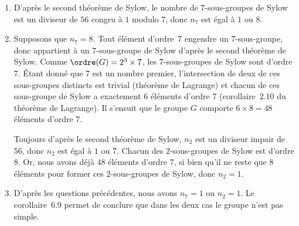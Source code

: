 \begin{enumerate}
  \item
    D'après le second théorème de Sylow, le nombre de $7$-sous-groupes de Sylow est un diviseur de $56$ congru à $1$ modulo 7, donc $n_7$ est égal à $1$ ou $8$.

  \item
    Supposons que $n_7 = 8$.
    Tout élément d'ordre~$7$ engendre un $7$-sous-groupe, donc appartient à un $7$-sous-groupe de Sylow d'après le second théorème de Sylow.
    Comme $\ordre(G) = 2^3\times 7$, les $7$-sous-groupes de Sylow sont d'ordre $7$.
    Étant donné que $7$ est un nombre premier, l'intersection de deux de ces sous-groupes distincts est trivial (théorème de Lagrange) et chacun de ces sous-groupe de Sylow a exactement $6$ éléments d'ordre $7$ (corollaire~2.10 du théorème de Lagrange).
    Il s'ensuit que le groupe $G$ comporte $6\times 8 = 48$ éléments d'ordre 7.

    Toujours d'après le second théorème de Sylow, $n_2$ est un diviseur impair de $56$, donc $n_2$ est égal à $1$ ou $7$.
    Chacun des $2$-sous-groupes de Sylow est d'ordre $8$.
    Or, nous avons déjà $48$ éléments d'ordre $7$, si bien qu'il ne reste que $8$ éléments pour former ces $2$-sous-groupes de Sylow, donc $n_2 = 1$.

  \item
    D'après les questions précédentes, nous avons $n_7 = 1$ ou $n_2 = 1$.
    Le corollaire~6.9 permet de conclure que dans les deux cas le groupe n'est pas simple.
\end{enumerate}
